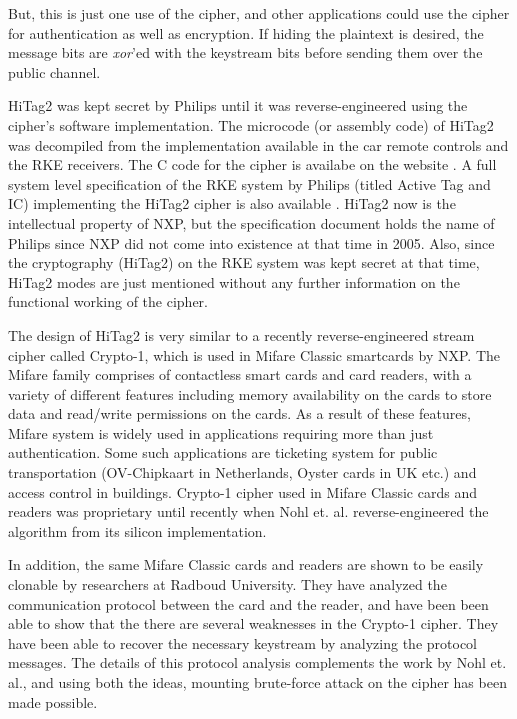 But, this is just one use of the cipher, and other applications could use the cipher for authentication as well as encryption. If hiding the plaintext is desired, the message bits are \emph{xor}'ed with the keystream bits before sending them over the public channel. 

HiTag2 was kept secret by Philips until it was reverse-engineered using the cipher's software implementation. The microcode (or assembly code) of HiTag2 was decompiled from the implementation available in the car remote controls and the RKE receivers. The C code for the cipher is availabe on the website \cite{hitag2-code}. A full system level specification of the RKE system by Philips (titled Active Tag and IC) implementing the HiTag2 cipher is also available \cite{active-tag-datasheet}. HiTag2 now is the intellectual property of NXP, but the specification document holds the name of Philips since NXP did not come into existence at that time in 2005. Also, since the cryptography (HiTag2) on the RKE system was kept secret at that time, HiTag2 modes are just mentioned without any further information on the functional working of the cipher.

The design of HiTag2 is very similar to a recently reverse-engineered \cite{NohlESP-2008-usenix} stream cipher called Crypto-1, which is used in Mifare Classic smartcards by NXP. The Mifare family comprises of contactless smart cards and card readers, with a variety of different features including memory availability on the cards to store data and read/write permissions on the cards. As a result of these features, Mifare system is widely used in applications requiring more than just authentication. Some such applications are ticketing system for public transportation (OV-Chipkaart in Netherlands, Oyster cards in UK etc.) and access control in buildings. Crypto-1 cipher used in Mifare Classic cards and readers was proprietary until recently when Nohl et. al. \cite{NohlESP-2008-usenix} reverse-engineered the algorithm from its silicon implementation.

In addition, the same Mifare Classic cards and readers are shown to be easily clonable \cite{dekoninggans2008pam} by researchers at Radboud University. They have analyzed the communication protocol between the card and the reader, and have been been able to show that the there are several weaknesses in the Crypto-1 cipher. They have been able to recover the necessary keystream by analyzing the protocol messages. The details of this protocol analysis complements the work by Nohl et. al., and using both the ideas, mounting brute-force attack on the cipher has been made possible. 

